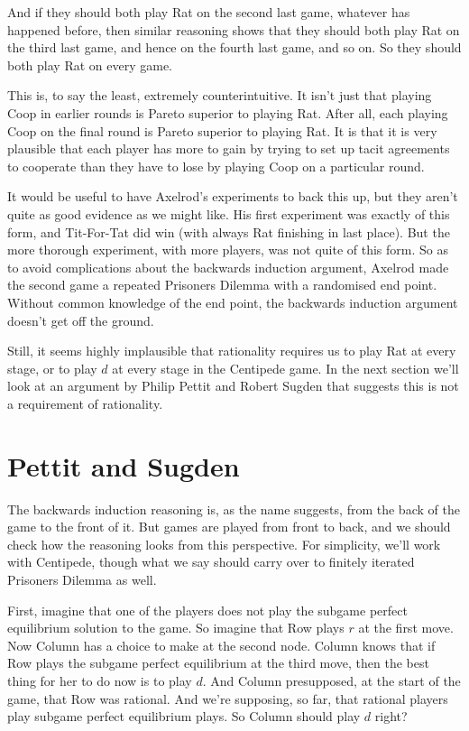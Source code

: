 And if they should both play Rat on the second last game, whatever has happened before, then similar reasoning shows that they should both play Rat on the third last game, and hence on the fourth last game, and so on. So they should both play Rat on every game.

This is, to say the least, extremely counterintuitive. It isn't just that playing Coop in earlier rounds is Pareto superior to playing Rat. After all, each playing Coop on the final round is Pareto superior to playing Rat. It is that it is very plausible that each player has more to gain by trying to set up tacit agreements to cooperate than they have to lose by playing Coop on a particular round.

It would be useful to have Axelrod's experiments to back this up, but they aren't quite as good evidence as we might like. His first experiment was exactly of this form, and Tit-For-Tat did win (with always Rat finishing in last place). But the more thorough experiment, with more players, was not quite of this form. So as to avoid complications about the backwards induction argument, Axelrod made the second game a repeated Prisoners Dilemma with a randomised end point. Without common knowledge of the end point, the backwards induction argument doesn't get off the ground.

Still, it seems highly implausible that rationality requires us to play Rat at every stage, or to play $d$ at every stage in the Centipede game. In the next section we'll look at an argument by Philip Pettit and Robert Sugden that suggests this is not a requirement of rationality.

\section{Pettit and Sugden}
The backwards induction reasoning is, as the name suggests, from the back of the game to the front of it. But games are played from front to back, and we should check how the reasoning looks from this perspective. For simplicity, we'll work with Centipede, though what we say should carry over to finitely iterated Prisoners Dilemma as well.

First, imagine that one of the players does not play the subgame perfect equilibrium solution to the game. So imagine that Row plays $r$ at the first move. Now Column has a choice to make at the second node. Column knows that if Row plays the subgame perfect equilibrium at the third move, then the best thing for her to do now is to play $d$. And Column presupposed, at the start of the game, that Row was rational. And we're supposing, so far, that rational players play subgame perfect equilibrium plays. So Column should play $d$ right?


